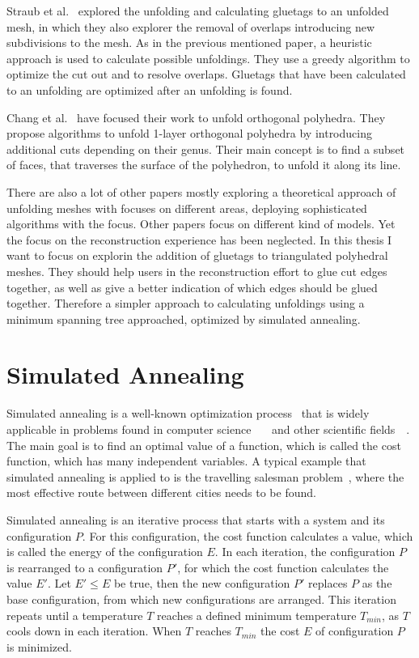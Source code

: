 \documentclass[draft,final]{vutinfth} %
\begin{document}
Straub et al.~\cite{straubcreating} explored the unfolding and calculating gluetags to an unfolded mesh, in which they also explorer the removal of overlaps introducing new subdivisions to the mesh. As in the previous mentioned paper, a heuristic approach is used to calculate possible unfoldings. They use a greedy algorithm to optimize the cut out and to resolve overlaps. Gluetags that have been calculated to an unfolding are optimized after an unfolding is found.

Chang et al.~\cite{xi2016learning} have focused their work to unfold orthogonal polyhedra. They propose algorithms to unfold 1-layer orthogonal polyhedra by introducing additional cuts depending on their genus. Their main concept is to find a subset of faces, that traverses the surface of the polyhedron, to unfold it along its line. 

There are also a lot of other papers mostly exploring a theoretical approach of unfolding meshes with focuses on different areas, deploying sophisticated algorithms with the focus. Other papers focus on different kind of models. Yet the focus on the reconstruction experience has been neglected. In this thesis I want to focus on explorin the addition of gluetags to triangulated polyhedral meshes. They should help users in the reconstruction effort to glue cut edges together, as well as give a better indication of which edges should be glued together. Therefore a simpler approach to calculating unfoldings using a minimum spanning tree approached, optimized by simulated annealing.

\section{Simulated Annealing}
\label{sec:sa}
Simulated annealing is a well-known optimization process~\cite{kirkpatrick1983optimization} that is widely applicable in problems found in computer science~\cite{goffe1994global}~\cite{dekkers1991global}~\cite{brooks1995optimization} and other scientific fields~\cite{pannetier1990prediction}~\cite{sutter1995automated}. The main goal is to find an optimal value of a function, which is called the cost function, which has many independent variables. A typical example that simulated annealing is applied to is the travelling salesman problem~\cite{malek1989serial}, where the most effective route between different cities needs to be found. 

Simulated annealing is an iterative process that starts with a system and its configuration $P$. For this configuration, the cost function calculates a value, which is called the energy of the configuration $E$. In each iteration, the configuration $P$ is rearranged to a configuration $P'$, for which the cost function calculates the value $E'$. Let $E' \leq E$ be true, then the new configuration $P'$ replaces $P$ as the base configuration, from which new configurations are arranged. This iteration repeats until a temperature $T$ reaches a defined minimum temperature $T_{min}$, as $T$ cools down in each iteration. When $T$ reaches $T_{min}$ the cost $E$ of configuration $P$ is minimized.
\end{document}
